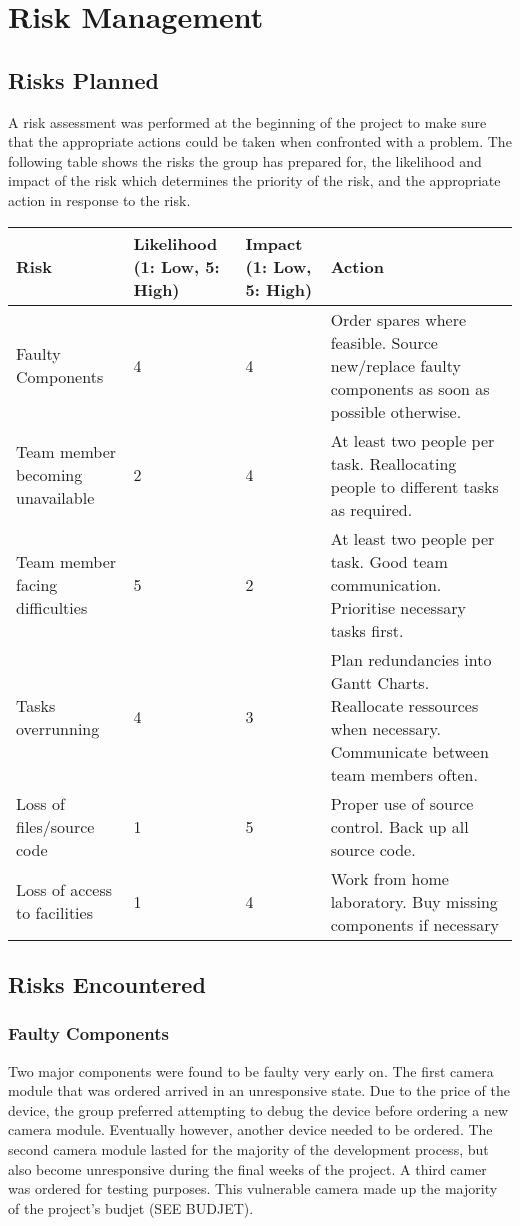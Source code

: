 \section{Risk Management}

\subsection{Risks Planned}
A risk assessment was performed at the beginning of the project to make sure that the appropriate actions could be taken when confronted with a problem. 
The following table shows the risks the group has prepared for, the likelihood and 
impact of the risk which determines the priority of the risk, and the appropriate action in response to the risk.

\begin{center}
	\begin{tabular}{ | p{4cm} | p{2cm} | p{2cm} | p{5cm} | }
	\hline
	\textbf{Risk} & \textbf{Likelihood (1: Low, 5: High)} & 
	\textbf{Impact (1: Low, 5: High)} & \textbf{Action} \\ \hline
	Faulty Components & 4 & 4 & Order spares where feasible.
	Source new/replace faulty components as soon as possible otherwise. \\ \hline
	Team member becoming unavailable & 2 & 4 & At least two people per task.
	Reallocating people to different tasks as required. \\ \hline
	Team member facing difficulties & 5 & 2 & At least two people per task.
	Good team communication. Prioritise necessary tasks first. \\ \hline
	Tasks overrunning & 4 & 3 & Plan redundancies into Gantt Charts.
	Reallocate ressources when necessary. Communicate between team members often. \\ \hline
	Loss of files/source code & 1 & 5 & Proper use of source control. Back up all source code. \\ \hline
	Loss of access to facilities & 1 & 4 & Work from home laboratory. 
	Buy missing components if necessary \\
	\hline
	\end{tabular}
\end{center}

\subsection{Risks Encountered}

\subsubsection*{Faulty Components}
Two major components were found to be faulty very early on. 
The first camera module that was ordered arrived in an unresponsive state. 
Due to the price of the device, the group preferred attempting to debug the device before ordering a new camera module. 
Eventually however, another device needed to be ordered. 
The second camera module lasted for the majority of the development process, but also 
become unresponsive during the final weeks of the project. A third camer was ordered for testing purposes. 
This vulnerable camera made up the majority of the project's budjet (SEE BUDJET).

